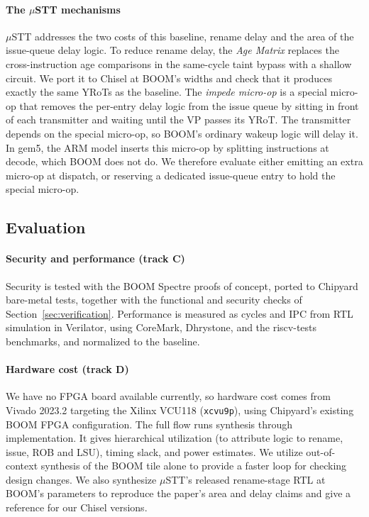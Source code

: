 \paragraph{The $\mu$STT mechanisms}
$\mu$STT addresses the two costs of this baseline, rename delay and the area of the issue-queue delay 
logic. To reduce rename delay, the \emph{Age Matrix} replaces the cross-instruction age comparisons 
in the same-cycle taint bypass with a shallow circuit. We port it to Chisel at BOOM's widths and 
check that it produces exactly the same YRoTs as the baseline. The \emph{impede micro-op} is a special 
micro-op that removes the per-entry delay logic from the issue queue by sitting in front of each transmitter 
and waiting until the VP passes its YRoT. The transmitter depends on the special 
micro-op, so BOOM's ordinary wakeup logic will delay it. In gem5, the ARM model inserts 
this micro-op by splitting instructions at decode, which BOOM does not do. We therefore evaluate 
either emitting an extra micro-op at dispatch, or reserving a dedicated issue-queue entry to hold 
the special micro-op.

\subsection{Evaluation}

\paragraph{Security and performance (track C)}
Security is tested with the BOOM Spectre proofs of concept, ported to Chipyard 
bare-metal tests, together with the functional and security checks of 
Section~\ref{sec:verification}. Performance is measured as cycles and IPC from RTL simulation in Verilator, 
using CoreMark, Dhrystone, and the riscv-tests benchmarks, and normalized to the baseline.

\paragraph{Hardware cost (track D)}
We have no FPGA board available currently, so hardware cost comes from Vivado 2023.2 targeting the
Xilinx VCU118 (\texttt{xcvu9p}), using Chipyard's existing BOOM FPGA configuration. The full flow 
runs synthesis through implementation. It gives hierarchical utilization (to attribute logic to rename, 
issue, ROB and LSU), timing slack, and power estimates. We utilize out-of-context synthesis of the BOOM 
tile alone to provide a faster loop for checking design changes. We also synthesize $\mu$STT's released 
rename-stage RTL at BOOM's parameters to reproduce the paper's area and delay claims and give a reference 
for our Chisel versions.

